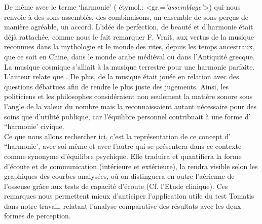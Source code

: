 De même avec le terme `harmonie' ( étymol.:
<gr.=\textit{'assemblage'}>) qui nous renvoie à
 des sons assemblés, des combinaisons, un ensemble de sons perçus de
 manière agréable, un accord. L'idée de perfection, de beauté et d'harmonie était déjà rattachée, comme 
 nous le fait remarquer F. Vrait, aux  vertus de la musique reconnues dans la mythologie et le
 monde des rites, depuis les temps ancestraux, que ce soit en Chine, dans le monde arabe
 médiéval ou dans l'Antiquité grecque. La musique cosmique s'alliait  à la musique terrestre pour une harmonie parfaite.
 L'auteur relate que  \autocite[80]{vrait_musicotherapie_2018}. De plus, de la musique 
était jouée en relation avec des questions débattues afin de rendre le plus juste des jugements.
Ainsi, les  politiciens  et les
philosophes considéraient non seulement la matière sonore  sous l'angle de la valeur du 
nombre mais la reconnaissaient autant nécessaire pour  des 
soins 
que d'utilité
publique, car l'équilibre personnel contribuait à une forme d' ``harmonie' civique.
 \\
Ce que nous allons rechercher ici, c'est la représentation de ce concept d' ``harmonie', avec soi-même 
et 
avec l'autre qui se présentera dans ce contexte comme synonyme d'équilibre
psychique. Elle traduira et quantifiera la forme d'écoute et de communication (intérieure et
extérieure), la rendra visible selon les graphiques %
 des courbes analysées, %
 où on distinguera en outre l'aérienne de l'osseuse grâce aux tests de capacité 
 d'écoute (Cf. l'Etude clinique).
Ces remarques nous permettent mieux d'anticiper
l'application utile du test Tomatis dans notre travail, relatant l'analyse
comparative des résultats avec les deux formes de perception.


